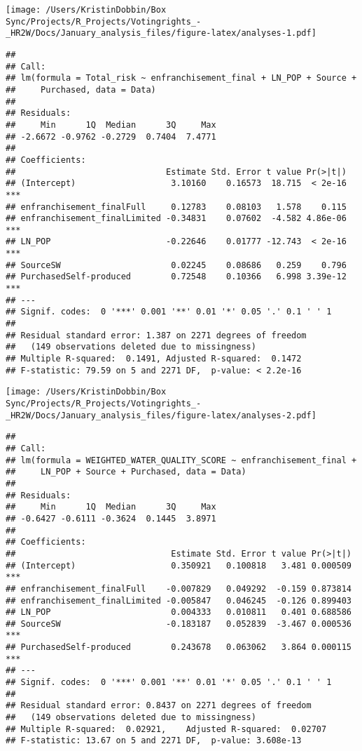 \documentclass[
]{article}
\begin{document}
\texttt{[image: /Users/KristinDobbin/Box Sync/Projects/R\_Projects/Votingrights\_-\_HR2W/Docs/January\_analysis\_files/figure-latex/analyses-1.pdf]}

\begin{verbatim}
## 
## Call:
## lm(formula = Total_risk ~ enfranchisement_final + LN_POP + Source + 
##     Purchased, data = Data)
## 
## Residuals:
##     Min      1Q  Median      3Q     Max 
## -2.6672 -0.9762 -0.2729  0.7404  7.4771 
## 
## Coefficients:
##                              Estimate Std. Error t value Pr(>|t|)    
## (Intercept)                   3.10160    0.16573  18.715  < 2e-16 ***
## enfranchisement_finalFull     0.12783    0.08103   1.578    0.115    
## enfranchisement_finalLimited -0.34831    0.07602  -4.582 4.86e-06 ***
## LN_POP                       -0.22646    0.01777 -12.743  < 2e-16 ***
## SourceSW                      0.02245    0.08686   0.259    0.796    
## PurchasedSelf-produced        0.72548    0.10366   6.998 3.39e-12 ***
## ---
## Signif. codes:  0 '***' 0.001 '**' 0.01 '*' 0.05 '.' 0.1 ' ' 1
## 
## Residual standard error: 1.387 on 2271 degrees of freedom
##   (149 observations deleted due to missingness)
## Multiple R-squared:  0.1491, Adjusted R-squared:  0.1472 
## F-statistic: 79.59 on 5 and 2271 DF,  p-value: < 2.2e-16
\end{verbatim}

\texttt{[image: /Users/KristinDobbin/Box Sync/Projects/R\_Projects/Votingrights\_-\_HR2W/Docs/January\_analysis\_files/figure-latex/analyses-2.pdf]}

\begin{verbatim}
## 
## Call:
## lm(formula = WEIGHTED_WATER_QUALITY_SCORE ~ enfranchisement_final + 
##     LN_POP + Source + Purchased, data = Data)
## 
## Residuals:
##     Min      1Q  Median      3Q     Max 
## -0.6427 -0.6111 -0.3624  0.1445  3.8971 
## 
## Coefficients:
##                               Estimate Std. Error t value Pr(>|t|)    
## (Intercept)                   0.350921   0.100818   3.481 0.000509 ***
## enfranchisement_finalFull    -0.007829   0.049292  -0.159 0.873814    
## enfranchisement_finalLimited -0.005847   0.046245  -0.126 0.899403    
## LN_POP                        0.004333   0.010811   0.401 0.688586    
## SourceSW                     -0.183187   0.052839  -3.467 0.000536 ***
## PurchasedSelf-produced        0.243678   0.063062   3.864 0.000115 ***
## ---
## Signif. codes:  0 '***' 0.001 '**' 0.01 '*' 0.05 '.' 0.1 ' ' 1
## 
## Residual standard error: 0.8437 on 2271 degrees of freedom
##   (149 observations deleted due to missingness)
## Multiple R-squared:  0.02921,    Adjusted R-squared:  0.02707 
## F-statistic: 13.67 on 5 and 2271 DF,  p-value: 3.608e-13
\end{verbatim}
\end{document}
